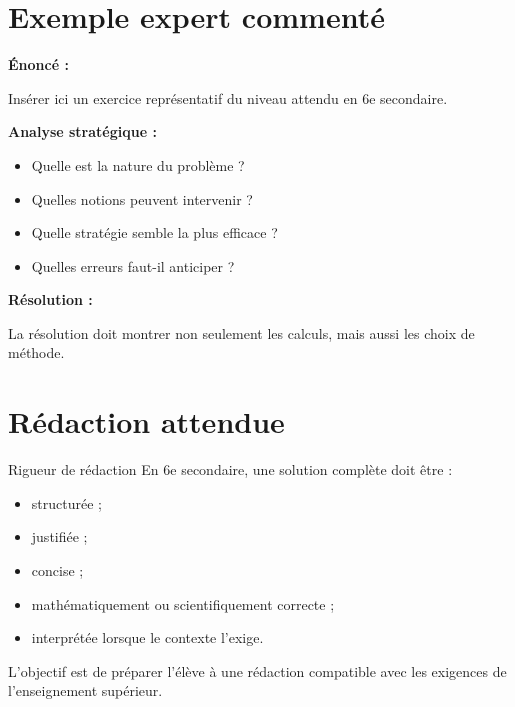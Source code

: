 \documentclass[11pt,a4paper]{article}
\begin{document}
\section{Exemple expert commenté}

\begin{cadreexemple}
\textbf{Énoncé :}

Insérer ici un exercice représentatif du niveau attendu en 6e secondaire.

\medskip

\textbf{Analyse stratégique :}
\begin{itemize}
    \item Quelle est la nature du problème ?
    \item Quelles notions peuvent intervenir ?
    \item Quelle stratégie semble la plus efficace ?
    \item Quelles erreurs faut-il anticiper ?
\end{itemize}

\medskip

\textbf{Résolution :}

La résolution doit montrer non seulement les calculs, mais aussi les choix de méthode.
\end{cadreexemple}

\section{Rédaction attendue}

\begin{cadrevert}{Rigueur de rédaction}
En 6e secondaire, une solution complète doit être :
\begin{itemize}
    \item structurée ;
    \item justifiée ;
    \item concise ;
    \item mathématiquement ou scientifiquement correcte ;
    \item interprétée lorsque le contexte l’exige.
\end{itemize}

\medskip

L’objectif est de préparer l’élève à une rédaction compatible avec les exigences de l’enseignement supérieur.
\end{cadrevert}
\end{document}
